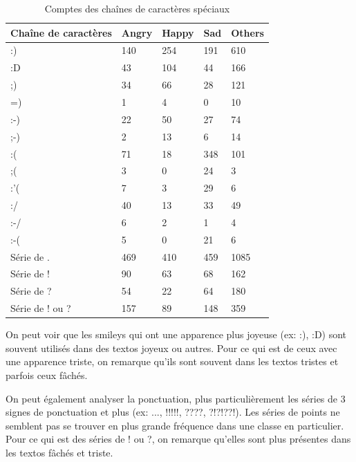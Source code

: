 \begin{longtable}[c]{@{}lllll@{}}
	\caption{Comptes des chaînes de caractères spéciaux}
	\label{table:binettes}\\
	\toprule
	Chaîne de caractères & Angry & Happy & Sad & Others \\* \midrule
	\endhead
	\bottomrule
	\endfoot
	\endlastfoot
	:)                   & 140   & 254   & 191 & 610    \\
	:D                   & 43    & 104   & 44  & 166    \\
	;)                   & 34    & 66    & 28  & 121    \\
	=)                   & 1     & 4     & 0   & 10     \\
	:-)                  & 22    & 50    & 27  & 74     \\
	;-)                  & 2     & 13    & 6   & 14     \\
	:(                   & 71    & 18    & 348 & 101    \\
	;(                   & 3     & 0     & 24  & 3      \\
	:'(                  & 7     & 3     & 29  & 6      \\
	:/                   & 40    & 13    & 33  & 49     \\
	:-/                  & 6     & 2     & 1   & 4      \\
	:-(                  & 5     & 0     & 21  & 6      \\
	Série de .           & 469   & 410   & 459 & 1085   \\
	Série de !           & 90    & 63    & 68  & 162    \\
	Série de ?           & 54    & 22    & 64  & 180    \\
	Série de ! ou ?      & 157   & 89    & 148 & 359    \\* \bottomrule
\end{longtable}

On peut voir que les smileys qui ont une apparence plus joyeuse (ex: :), :D) sont souvent utilisés dans des textos joyeux ou autres. Pour ce qui est de ceux avec une apparence triste, on remarque qu'ils sont souvent dans les textos tristes et parfois ceux fâchés.

On peut également analyser la ponctuation, plus particulièrement les séries de 3 signes de ponctuation et plus (ex: ..., !!!!!, ????, ?!?!??!). Les séries de points ne semblent pas se trouver en plus grande fréquence dans une classe en particulier. Pour ce qui est des séries de ! ou ?, on remarque qu'elles sont plus présentes dans les textos fâchés et triste.

